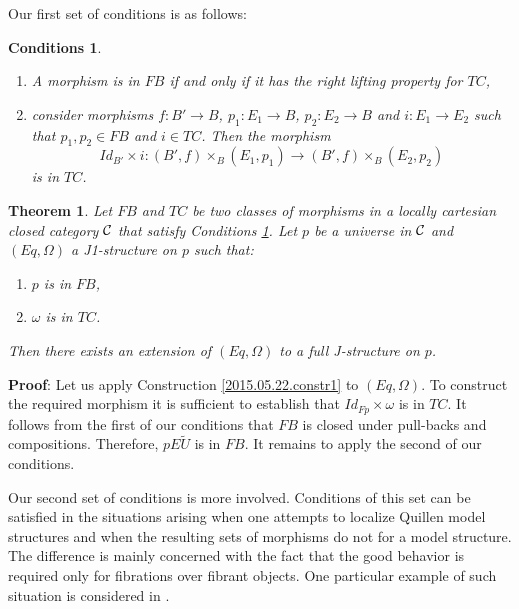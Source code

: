 \documentclass[12pt]{article}
\newenvironment{myproof}{{\bf Proof}:}{\vskip 5mm }
\newtheorem{theorem}[proposition]{Theorem}
\newtheorem{cond}[proposition]{Conditions}
\newcommand{\llabel}[1]{\label{#1}}
\newcommand{\sr}{\rightarrow}
\newcommand{\wt}{\widetilde}
\begin{document}
Our first set of conditions is as follows:
%
\begin{cond}\llabel{2015.05.22.cond2}
\begin{enumerate}
\item A morphism is in $FB$ if and only if it has the right lifting property for $TC$,
\item consider morphisms $f: B'\sr B$, $p_1:E_1\sr B$, $p_2:E_2\sr B$ and $i:E_1\sr E_2$ such that $p_1,p_2\in FB$ and $i\in TC$. Then the morphism
%
$$Id_{B'}\times i: (B',f)\times_B(E_1,p_1)\sr (B',f)\times_B(E_2,p_2)$$
%
is in $TC$.
\end{enumerate}
\end{cond}
%
\begin{theorem}
\llabel{2015.05.22.th1}
Let $FB$ and $TC$ be two classes of morphisms in a locally cartesian closed category $\cal C$ that satisfy Conditions \ref{2015.05.22.cond2}. Let $p$ be a universe in $\cal C$ and $(Eq,\Omega)$ a J1-structure on $p$ such that:
%
\begin{enumerate}
\item $p$ is in $FB$,
\item $\omega$ is in $TC$.
\end{enumerate}
%
Then there exists an extension of $(Eq,\Omega)$ to a full J-structure on $p$.
\end{theorem}
%
\begin{myproof}
Let us apply Construction \ref{2015.05.22.constr1} to $(Eq,\Omega)$. To construct the required morphism it is sufficient to establish that $Id_{Fp}\times\omega$ is in $TC$. It follows from the first of our conditions that $FB$ is closed under pull-backs and compositions. Therefore, $pE\wt{U}$ is in $FB$. It remains to apply the second of our conditions.
\end{myproof}
% 





Our second set of conditions is more involved. Conditions of this set can be satisfied in the situations arising when one attempts to localize Quillen model structures and when the resulting sets of morphisms do not for a model structure. The difference is mainly concerned with the fact that the good behavior is required only for fibrations over fibrant objects. One particular example of such situation is considered in \cite[Section 3.3]{SRF}.
\end{document}
